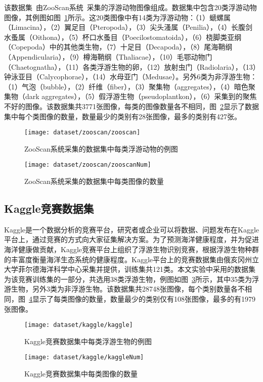 该数据集~\cite{gorsky2010digital}由ZooScan系统~\cite{grosjean2004enumeration}采集的浮游动物图像组成。数据集中包含20类浮游动物图像，其例图如图~\ref{fig:zooscan}所示。这20类图像中有14类为浮游动物：（1）螔螺属（Limacina），（2）翼足目（Pteropoda），（3）尖头溞属（Penilia），（4）长腹剑水蚤属（Oithona），（5）杯口水蚤目（Poecilostomatoida），（6）桡脚类亚纲（Copepoda）中的其他类生物，（7）十足目（Decapoda），（8）尾海鞘纲（Appendicularia），（9）樽海鞘纲（Thaliacae），（10）毛鄂动物门（Chaetognatha），（11）各类浮游生物的卵，（12）放射虫门（Radiolaria），（13）钟泳亚目（Calycophorae），（14）水母亚门（Medusae）。另外6类为非浮游生物：（1）气泡（bubble），（2）纤维（fiber），（3）聚集物（aggregates），（4）暗色聚集物（dark aggregates），（5）假浮游生物（pseudoplantkon），（6）采集到的聚焦不好的图像。该数据集共3771张图像，每类的图像数量各不相同，图~\ref{fig:zooscanNum}显示了数据集中每个类图像的数量，数量最少的类别有28张图像，最多的类别有427张。
\begin{figure}[H] %
  \centering
  \texttt{[image: dataset/zooscan/zooscan]}
  \caption{ZooScan系统采集的数据集中每类浮游动物的例图}
  \label{fig:zooscan}
\end{figure}
\begin{figure}[H] %
  \centering
  \texttt{[image: dataset/zooscan/zooscanNum]}
  \caption{ZooScan系统采集的数据集中每类图像的数量}
  \label{fig:zooscanNum}
\end{figure}


\subsection{Kaggle竞赛数据集}
\label{sec:kaggledataset}

Kaggle是一个数据分析的竞赛平台，研究者或企业可以将数据、问题发布在Kaggle平台上，通过竞赛的方式向大家征集解决方案。为了预测海洋健康程度，并为促进海洋健康做贡献，Kaggle竞赛平台上组织了浮游生物识别竞赛，根据浮游生物种群的丰富度衡量海洋生态系统的健康程度。Kaggle平台上的竞赛数据集由俄亥冈州立大学菲尔德海洋科学中心采集并提供，训练集共121类。本文实验中采用的数据集为该竞赛训练集的一部分，共选用38类浮游生物，例图如图~\ref{fig:kaggle}所示，其中35类为浮游生物，另外3类为非浮游生物。该数据集共28748张图像，每个类别数量各不相同，图~\ref{fig:kaggleNum}显示了每类图像的数量，数量最少的类别仅有108张图像，最多的有1979张图像。
\begin{figure}[H] %
  \centering
  \texttt{[image: dataset/kaggle/kaggle]}
  \caption{Kaggle竞赛数据集中每类浮游生物的例图}
  \label{fig:kaggle}
\end{figure}
\begin{figure}[H] %
  \centering
  \texttt{[image: dataset/kaggle/kaggleNum]}
  \caption{Kaggle竞赛数据集中每类图像的数量}
  \label{fig:kaggleNum}
\end{figure}


